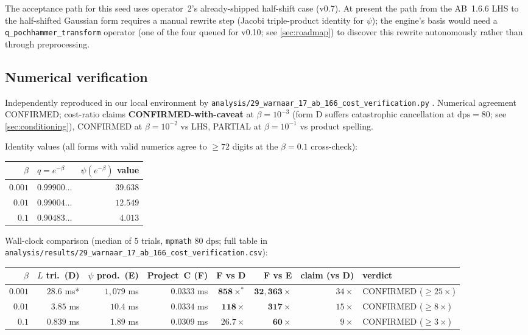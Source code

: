 \documentclass[11pt,reqno]{amsart}
\theoremstyle{definition}
\newcommand{\dps}{\mathrm{dps}}
\begin{document}
The acceptance path for this seed uses operator~2's already-shipped
half-shift case (v0.7). At present the path from the AB~1.6.6 LHS to
the half-shifted Gaussian form requires a manual rewrite step (Jacobi
triple-product identity for $\psi$); the engine's basis would need a
\verb|q_pochhammer_transform| operator (one of the four queued for
v0.10; see \cref{sec:roadmap}) to discover this rewrite autonomously
rather than through preprocessing.

\subsection{Numerical verification}\label{sec:ab166-verification}

Independently reproduced in our local environment by
\verb|analysis/29_warnaar_17_ab_166_cost_verification.py|
\cite[diary~43]{ProjectC}. Numerical agreement CONFIRMED; cost-ratio
claims \textbf{CONFIRMED-with-caveat} at $\beta = 10^{-3}$ (form D
suffers catastrophic cancellation at $\dps = 80$; see
\cref{sec:conditioning}), CONFIRMED at $\beta = 10^{-2}$ vs LHS,
PARTIAL at $\beta = 10^{-1}$ vs product spelling.

Identity values (all forms with valid numerics agree to $\ge 72$
digits at the $\beta = 0.1$ cross-check):
\begin{center}
\begin{tabular}{r l r}
\toprule
$\beta$ & $q = e^{-\beta}$ & $\psi(e^{-\beta})$ value \\
\midrule
$0.001$ & $0.99900\ldots$ & $39.638$ \\
$0.01$  & $0.99004\ldots$ & $12.549$ \\
$0.1$   & $0.90483\ldots$ & $4.013$  \\
\bottomrule
\end{tabular}
\end{center}

Wall-clock comparison (median of $5$ trials, \texttt{mpmath} $80$
$\dps$; full table in
\verb|analysis/results/29_warnaar_17_ab_166_cost_verification.csv|):

\begin{center}
\small
\begin{tabular}{r r r r r r r l}
\toprule
$\beta$ & $L$ tri.\ (D) & $\psi$ prod.\ (E) & Project~C (F) & F vs D & F vs E & claim (vs D) & verdict \\
\midrule
$0.001$ & $28.6$ ms*  & $1{,}079$ ms & $0.0333$ ms & $\mathbf{858\times^{*}}$ & $\mathbf{32{,}363\times}$ & $34\times$ & CONFIRMED ($\ge 25\times$) \\
$0.01$  & $3.85$ ms   & $10.4$ ms    & $0.0334$ ms & $\mathbf{118\times}$     & $\mathbf{317\times}$      & $15\times$ & CONFIRMED ($\ge 8\times$)  \\
$0.1$   & $0.839$ ms  & $1.89$ ms    & $0.0309$ ms & $\mathbf{26.7\times}$    & $\mathbf{60\times}$       & $9\times$  & CONFIRMED ($\ge 3\times$)  \\
\bottomrule
\end{tabular}
\end{center}
\end{document}
